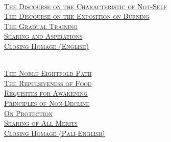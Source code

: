 {  {\libertinusFont\selectfont\textbf{\textsc{\ifafiveversion\fontsize{18}{12}\fi\ifninebythirteenversion\fontsize{13}{8.5}\fi\ifbfiveversion\fontsize{22}{18}\fi\selectfont{}}}}\\
  \textsc{\ifafiveversion\fontsize{14.4}{28}\fi\ifninebythirteenversion\fontsize{8.7}{17}\fi\ifbfiveversion\fontsize{16}{33.5}\fi\selectfont
    \hyperref[characteristic-of-not-self]{The Discourse on the Characteristic of Not-Self} \ifdigitalversion\else\pageref{characteristic-of-not-self}\fi\\
    \hyperref[exposition-on-burning]{The Discourse on the Exposition on Burning} \ifdigitalversion\else\pageref{exposition-on-burning}\fi\\
    \hyperref[gradual-training]{The Gradual Training} \ifdigitalversion\else\pageref{gradual-training}\fi\\
    \hyperref[sharing-aspirations]{Sharing and Aspirations} \ifdigitalversion\else\pageref{sharing-aspirations}\fi\\
    \hyperref[closing-homage]{Closing Homage (English)} \ifdigitalversion\else\pageref{closing-homage}\fi\\
  }

  \clearpage

  {\libertinusFont\selectfont\textbf{\textsc{\ifafiveversion\fontsize{18}{12}\fi\ifninebythirteenversion\fontsize{13}{8.5}\fi\ifbfiveversion\fontsize{22}{18}\fi\selectfont{}}}}\\

\textsc{\ifafiveversion\fontsize{14.4}{28}\fi\ifninebythirteenversion\fontsize{8.7}{17}\fi\ifbfiveversion\fontsize{16}{33.5}\fi\selectfont
    \hyperref[noble-eightfold-path]{The Noble Eightfold Path} \ifdigitalversion\else\pageref{noble-eightfold-path}\fi\\
    \hyperref[repulsiveness-of-food]{The Repulsiveness of Food} \ifdigitalversion\else\pageref{repulsiveness-of-food}\fi\\
    \hyperref[requisites-for-awakening]{Requisites for Awakening} \ifdigitalversion\else\pageref{requisites-for-awakening}\fi\\
    \hyperref[principles-of-non-decline]{Principles of Non-Decline} \ifdigitalversion\else\pageref{principles-of-non-decline}\fi\\
    \hyperref[protection]{On Protection} \ifdigitalversion\else\pageref{protection}\fi\\
    \hyperref[sharing-all-merits]{Sharing of All Merits} \ifdigitalversion\else\pageref{sharing-all-merits}\fi\\
    \hyperref[closing-homage]{Closing Homage (Pāli-English)} \ifdigitalversion\else\pageref{closing-homage}\fi\\
  }

}
